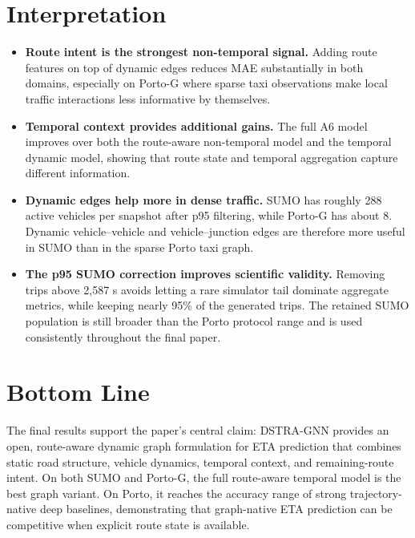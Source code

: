 \documentclass[10pt,a4paper]{article}
\begin{document}
\section{Interpretation}

\begin{itemize}
    \item \textbf{Route intent is the strongest non-temporal signal.} Adding route features on top of dynamic edges reduces MAE substantially in both domains, especially on Porto-G where sparse taxi observations make local traffic interactions less informative by themselves.
    \item \textbf{Temporal context provides additional gains.} The full A6 model improves over both the route-aware non-temporal model and the temporal dynamic model, showing that route state and temporal aggregation capture different information.
    \item \textbf{Dynamic edges help more in dense traffic.} SUMO has roughly 288 active vehicles per snapshot after p95 filtering, while Porto-G has about 8. Dynamic vehicle--vehicle and vehicle--junction edges are therefore more useful in SUMO than in the sparse Porto taxi graph.
    \item \textbf{The p95 SUMO correction improves scientific validity.} Removing trips above 2,587 s avoids letting a rare simulator tail dominate aggregate metrics, while keeping nearly 95\% of the generated trips. The retained SUMO population is still broader than the Porto protocol range and is used consistently throughout the final paper.
\end{itemize}

\section{Bottom Line}

The final results support the paper's central claim: DSTRA-GNN provides an open, route-aware dynamic graph formulation for ETA prediction that combines static road structure, vehicle dynamics, temporal context, and remaining-route intent. On both SUMO and Porto-G, the full route-aware temporal model is the best graph variant. On Porto, it reaches the accuracy range of strong trajectory-native deep baselines, demonstrating that graph-native ETA prediction can be competitive when explicit route state is available.
\end{document}
